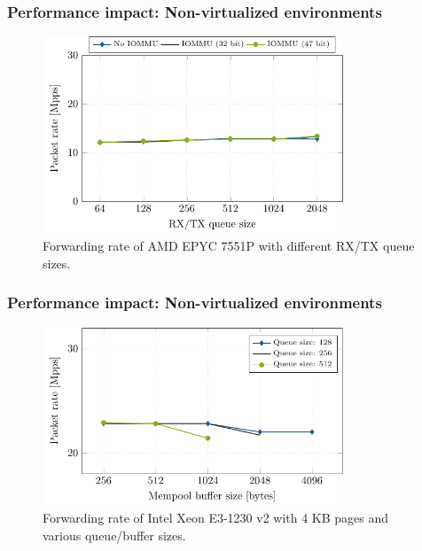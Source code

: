 \begin{frame}
    \frametitle{Performance impact: Non-virtualized environments}

    \begin{figure}
        \centering
        \includegraphics[width=0.8\textwidth,clip]{figures/queue-20.pdf}
        \caption{Forwarding rate of AMD EPYC 7551P with different RX/TX queue
        sizes.}
    \end{figure}
\end{frame}

\begin{frame}
    \frametitle{Performance impact: Non-virtualized environments}

    \begin{figure}
        \centering
        \includegraphics[width=0.8\textwidth,clip]{figures/iotlb-33.pdf}
        \caption{Forwarding rate of Intel Xeon E3-1230 v2 with 4 KB pages and
        various queue/buffer sizes.}
    \end{figure}
\end{frame}

